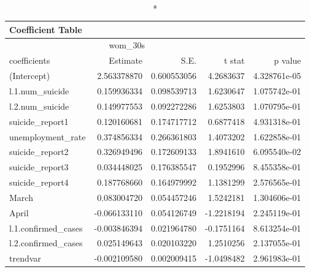 \begin{longtable}{lrrrr}
\caption*{
{\large Coefficient Table}
} \\ 
\toprule
\multicolumn{4}{c}{wom\_30s} &  \\ 
\cmidrule(lr){1-4}
coefficients & Estimate & S.E. & t stat & p value \\ 
\midrule\addlinespace[2.5pt]
(Intercept) & 2.563378870 & 0.600553056 & 4.2683637 & 4.328761e-05 \\ 
l.1.num\_suicide & 0.159936334 & 0.098539713 & 1.6230647 & 1.075742e-01 \\ 
l.2.num\_suicide & 0.149977553 & 0.092272286 & 1.6253803 & 1.070795e-01 \\ 
suicide\_report1 & 0.120160681 & 0.174717712 & 0.6877418 & 4.931318e-01 \\ 
unemployment\_rate & 0.374856334 & 0.266361803 & 1.4073202 & 1.622858e-01 \\ 
suicide\_report2 & 0.326949496 & 0.172609133 & 1.8941610 & 6.095540e-02 \\ 
suicide\_report3 & 0.034448025 & 0.176385547 & 0.1952996 & 8.455358e-01 \\ 
suicide\_report4 & 0.187768660 & 0.164979992 & 1.1381299 & 2.576565e-01 \\ 
March & 0.083004720 & 0.054457246 & 1.5242181 & 1.304606e-01 \\ 
April & -0.066133110 & 0.054126749 & -1.2218194 & 2.245119e-01 \\ 
l.1.confirmed\_cases & -0.003846394 & 0.021964780 & -0.1751164 & 8.613254e-01 \\ 
l.2.confirmed\_cases & 0.025149643 & 0.020103220 & 1.2510256 & 2.137055e-01 \\ 
trendvar & -0.002109580 & 0.002009415 & -1.0498482 & 2.961983e-01 \\ 
\bottomrule
\end{longtable}


